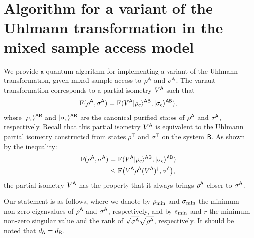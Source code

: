 



\section{Algorithm for a variant of the Uhlmann transformation in the mixed sample access model}
\label{sec:altanative mixed sample uhlmann}


 

We provide a quantum algorithm for implementing a variant of the Uhlmann transformation, given mixed sample access to $\rho^{\mathsf{A}}$ and $\sigma^{\mathsf{A}}$.
The variant transformation corresponds to a partial isometry $V^{\mathsf{A}}$ such that
\begin{align}
\label{inteq:144}
    {\mathrm{F}}(\rho^{\mathsf{A}}, \sigma^{\mathsf{A}}) = {\mathrm{F}}(V^{\mathsf{A}}|\rho_{\rm c}\rangle^{{\mathsf{A}}{\mathsf{B}}}, |\sigma_{\rm c}\rangle^{{\mathsf{A}}{\mathsf{B}}}),
\end{align}
where $|\rho_{\rm c}\rangle^{{\mathsf{A}}{\mathsf{B}}}$ and $|\sigma_{\rm c}\rangle^{{\mathsf{A}}{\mathsf{B}}}$ are the canonical purified states of $\rho^{\mathsf{A}}$ and $\sigma^{\mathsf{A}}$, respectively.
Recall that this partial isometry $V^{\mathsf{A}}$ is equivalent to the Uhlmann partial isometry constructed from states $\rho^\top$ and $\sigma^\top$ on the system ${\mathsf{B}}$.
As shown by the inequality:
\begin{align}
    {\mathrm{F}}(\rho^{\mathsf{A}}, \sigma^{\mathsf{A}}) 
    &= {\mathrm{F}}(V^{\mathsf{A}}|\rho_{\rm c}\rangle^{{\mathsf{A}}{\mathsf{B}}}, |\sigma_{\rm c}\rangle^{{\mathsf{A}}{\mathsf{B}}}) \\
    &\leq {\mathrm{F}}\big(V^{\mathsf{A}}\rho^{\mathsf{A}}(V^{\mathsf{A}})^\dag, \sigma^{\mathsf{A}}\big),
\end{align}
the partial isometry $V^{\mathsf{A}}$ has the property that it always brings $\rho^{\mathsf{A}}$ closer to $\sigma^{\mathsf{A}}$.


Our statement is as follows, where we denote by $\rho_{\rm min}$ and $\sigma_{\rm min}$ the minimum non-zero eigenvalues of $\rho^{\mathsf{A}}$ and $\sigma^{{\mathsf{A}}}$, respectively, and by $s_{\rm min}$ and $r$ the minimum non-zero singular value and the rank of $\sqrt{\sigma^{\mathsf{A}}}\sqrt{\rho^{\mathsf{A}}}$, respectively.
It should be noted that $d_{\mathsf{A}} = d_{\mathsf{B}}$. 





